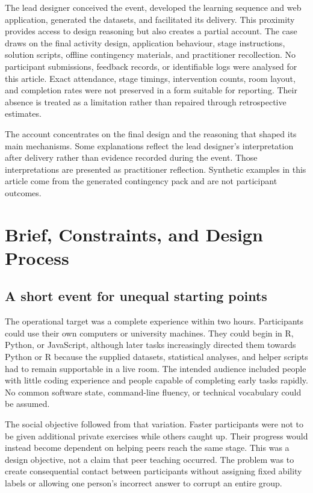 \documentclass[11pt,a4paper]{article}
\begin{document}
The lead designer conceived the event, developed the learning sequence and web application, generated the datasets, and facilitated its delivery. This proximity provides access to design reasoning but also creates a partial account. The case draws on the final activity design, application behaviour, stage instructions, solution scripts, offline contingency materials, and practitioner recollection. No participant submissions, feedback records, or identifiable logs were analysed for this article. Exact attendance, stage timings, intervention counts, room layout, and completion rates were not preserved in a form suitable for reporting. Their absence is treated as a limitation rather than repaired through retrospective estimates.

The account concentrates on the final design and the reasoning that shaped its main mechanisms. Some explanations reflect the lead designer's interpretation after delivery rather than evidence recorded during the event. Those interpretations are presented as practitioner reflection. Synthetic examples in this article come from the generated contingency pack and are not participant outcomes.

\section{Brief, Constraints, and Design Process}

\subsection{A short event for unequal starting points}

The operational target was a complete experience within two hours. Participants could use their own computers or university machines. They could begin in R, Python, or JavaScript, although later tasks increasingly directed them towards Python or R because the supplied datasets, statistical analyses, and helper scripts had to remain supportable in a live room. The intended audience included people with little coding experience and people capable of completing early tasks rapidly. No common software state, command-line fluency, or technical vocabulary could be assumed.

The social objective followed from that variation. Faster participants were not to be given additional private exercises while others caught up. Their progress would instead become dependent on helping peers reach the same stage. This was a design objective, not a claim that peer teaching occurred. The problem was to create consequential contact between participants without assigning fixed ability labels or allowing one person's incorrect answer to corrupt an entire group.
\end{document}
